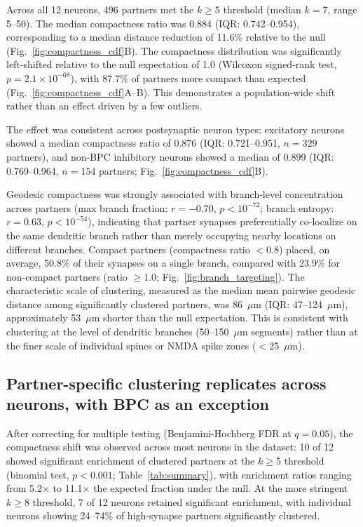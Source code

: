 Across all 12 neurons, 496 partners met the $k \geq 5$ threshold (median $k = 7$, range 5--50). The median compactness ratio was 0.884 (IQR: 0.742--0.954), corresponding to a median distance reduction of 11.6\% relative to the null (Fig.~\ref{fig:compactness_cdf}B). The compactness distribution was significantly left-shifted relative to the null expectation of 1.0 (Wilcoxon signed-rank test, $p = 2.1 \times 10^{-68}$), with 87.7\% of partners more compact than expected (Fig.~\ref{fig:compactness_cdf}A--B). This demonstrates a population-wide shift rather than an effect driven by a few outliers.

The effect was consistent across postsynaptic neuron types: excitatory neurons showed a median compactness ratio of 0.876 (IQR: 0.721--0.951, $n = 329$ partners), and non-BPC inhibitory neurons showed a median of 0.899 (IQR: 0.769--0.964, $n = 154$ partners; Fig.~\ref{fig:compactness_cdf}B).

Geodesic compactness was strongly associated with branch-level concentration across partners (max branch fraction: $r = -0.70$, $p < 10^{-72}$; branch entropy: $r = 0.63$, $p < 10^{-54}$), indicating that partner synapses preferentially co-localize on the same dendritic branch rather than merely occupying nearby locations on different branches. Compact partners (compactness ratio $< 0.8$) placed, on average, 50.8\% of their synapses on a single branch, compared with 23.9\% for non-compact partners (ratio $\geq 1.0$; Fig.~\ref{fig:branch_targeting}). The characteristic scale of clustering, measured as the median mean pairwise geodesic distance among significantly clustered partners, was 86~$\mu$m (IQR: 47--124~$\mu$m), approximately 53~$\mu$m shorter than the null expectation. This is consistent with clustering at the level of dendritic branches (50--150~$\mu$m segments) rather than at the finer scale of individual spines or NMDA spike zones ($<$25~$\mu$m).

\subsection{Partner-specific clustering replicates across neurons, with BPC as an exception}

After correcting for multiple testing (Benjamini-Hochberg FDR at $q = 0.05$), the compactness shift was observed across most neurons in the dataset: 10 of 12 showed significant enrichment of clustered partners at the $k \geq 5$ threshold (binomial test, $p < 0.001$; Table~\ref{tab:summary}), with enrichment ratios ranging from 5.2$\times$ to 11.1$\times$ the expected fraction under the null. At the more stringent $k \geq 8$ threshold, 7 of 12 neurons retained significant enrichment, with individual neurons showing 24--74\% of high-synapse partners significantly clustered.

